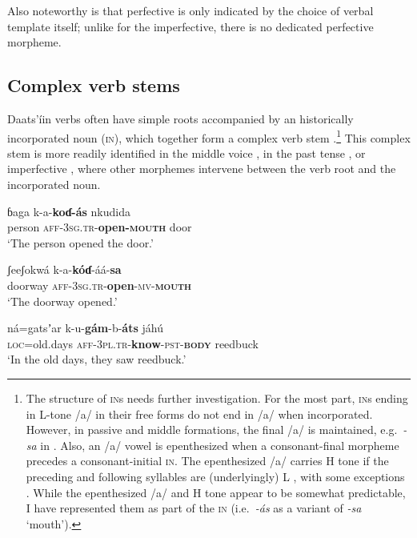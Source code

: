 \documentclass[output=paper]{langsci/langscibook}
\begin{document}
Also noteworthy is that perfective is only indicated by the choice of verbal template itself; unlike for the imperfective, there is no dedicated perfective morpheme.

\subsection{Complex verb stems}\label{sec:ahlandc:4.1}

Daats’\'{i}in verbs often have simple roots accompanied by an historically incorporated noun (\textsc{in}), which together form a complex verb stem .\footnote{The structure of \textsc{in}s needs further investigation. For the most part, \textsc{in}s ending in L-tone /a/ in their free forms do not end in /a/ when incorporated. However, in passive and middle formations, the final /a/ is maintained, e.g.\ \textit{{}-sa} in . Also, an /a/ vowel is epenthesized when a consonant-final morpheme precedes a consonant-initial \textsc{in}. The epenthesized /a/ carries H tone if the preceding and following syllables are (underlyingly) L , with some exceptions . While the epenthesized /a/ and H tone appear to be somewhat predictable, I have represented them as part of the \textsc{in} (i.e.\ \textit{{}-\'{a}s} as a variant of \textit{{}-sa} ‘mouth’). } This complex stem is more readily identified in the middle voice , in the past tense , or imperfective , where other morphemes intervene between the verb root and the incorporated noun.

\ea\label{ex:ahlandc:8}
\gll
ɓaga  k-a-\textbf{koɗ-\'{a}s}    nkudida  \\ 
person  \textsc{aff}{}-\textsc{3sg.tr}{}-\textbf{open-}\textbf{\textsc{mouth}}    door \\
\glt
‘The person opened the door.’ 
\z

\ea\label{ex:ahlandc:9}
\gll 
ʃeeʃokw\'{a}   k-a-\textbf{k\'{o}ɗ}{}-\'{a}\'{a}-\textbf{sa} \\
doorway   \textsc{aff-3sg.tr}{}-\textbf{open}{}-\textsc{mv-}\textbf{\textsc{mouth}} \\
\glt
‘The doorway opened.’
\z

\ea\label{ex:ahlandc:10}
\gll 
n\'{a}=gatsʼar  k-u-\textbf{g\'{a}m}{}-b-\textbf{\'{a}ts}                             j\'{a}hú \\
\textsc{loc}=old.days  \textsc{aff}\textsc{{}-3pl.tr}{}-\textbf{know}{}-\textsc{pst-}\textbf{\textsc{body}}    reedbuck \\
\glt
‘In the old days, they saw reedbuck.’
\z
\end{document}
